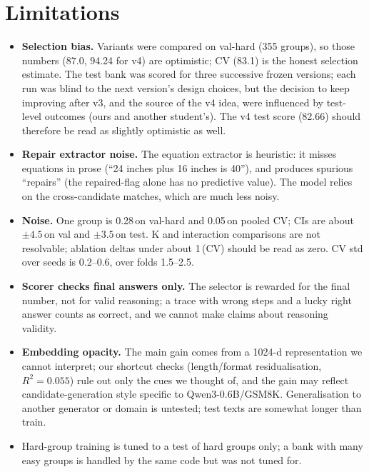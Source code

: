 \documentclass[10pt,a4paper]{article}
\newcommand{\pt}{\,\text{pt}}
\begin{document}
\section{Limitations}
\begin{itemize}
\item \textbf{Selection bias.} Variants were compared on val-hard (355 groups), so those numbers (87.0, 94.24 for v4) are optimistic; CV (83.1) is the honest selection estimate. The test bank was scored for three successive frozen versions; each run was blind to the next version's design choices, but the decision to keep improving after v3, and the source of the v4 idea, were influenced by test-level outcomes (ours and another student's). The v4 test score (82.66) should therefore be read as slightly optimistic as well.
\item \textbf{Repair extractor noise.} The equation extractor is heuristic: it misses equations in prose (``24 inches plus 16 inches is 40''), and produces spurious ``repairs'' (the repaired-flag alone has no predictive value). The model relies on the cross-candidate matches, which are much less noisy.
\item \textbf{Noise.} One group is 0.28\pt on val-hard and 0.05\pt on pooled CV; CIs are about $\pm4.5$\pt on val and $\pm3.5$\pt on test. K and interaction comparisons are not resolvable; ablation deltas under about 1\pt (CV) should be read as zero. CV std over seeds is 0.2--0.6, over folds 1.5--2.5.
\item \textbf{Scorer checks final answers only.} The selector is rewarded for the final number, not for valid reasoning; a trace with wrong steps and a lucky right answer counts as correct, and we cannot make claims about reasoning validity.
\item \textbf{Embedding opacity.} The main gain comes from a 1024-d representation we cannot interpret; our shortcut checks (length/format residualisation, $R^2=0.055$) rule out only the cues we thought of, and the gain may reflect candidate-generation style specific to Qwen3-0.6B/GSM8K. Generalisation to another generator or domain is untested; test texts are somewhat longer than train.
\item Hard-group training is tuned to a test of hard groups only; a bank with many easy groups is handled by the same code but was not tuned for.
\end{itemize}
\end{document}
